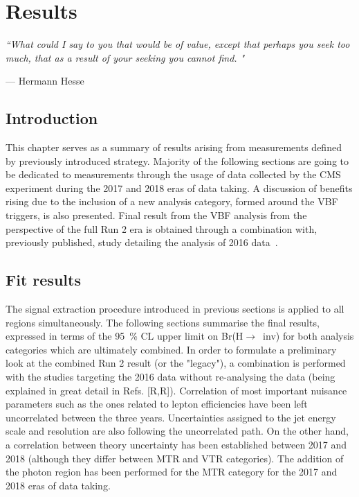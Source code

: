 \chapter{Results}
\label{ch:results}
\epigraph{\itshape``What could I say to you that would be of value, except that perhaps you seek too much, that as a result of your seeking you cannot find. "}{--- \textup{Hermann Hesse}}
\mediumlinespacing

\section{Introduction}
\hspace{10pt} This chapter serves as a summary of results arising from measurements defined by previously introduced strategy. Majority of the following sections are going to be dedicated to measurements through the usage of data collected by the CMS experiment during the 2017 and 2018 eras of data taking. A discussion of benefits rising due to the inclusion of a new analysis category, formed around the VBF triggers, is also presented. Final result from the VBF analysis from the perspective of the full Run 2 era is obtained through a combination with, previously published, study detailing the analysis of 2016 data~\cite{paper:HIG_17_023}.
\newpage
\section{Fit results}

\hspace{10pt} The signal extraction procedure introduced in previous sections is applied to all regions simultaneously. The following sections summarise the final results, expressed in terms of the 95~\% CL upper limit on Br(H$\rightarrow$~inv) for both analysis categories which are ultimately combined. In order to formulate a preliminary look at the combined Run 2 result (or the "legacy"), a combination is performed with the studies targeting the 2016 data without re-analysing the data (being explained in great detail in Refs. [R,R]). Correlation of most important nuisance parameters such as the ones related to lepton efficiencies have been left uncorrelated between the three years. Uncertainties assigned to the jet energy scale and resolution are also following the uncorrelated path. On the other hand, a correlation between theory uncertainty has been established between 2017 and 2018 (although they differ between MTR and VTR categories). The addition of the photon region has been performed for the MTR category for the 2017 and 2018 eras of data taking.

